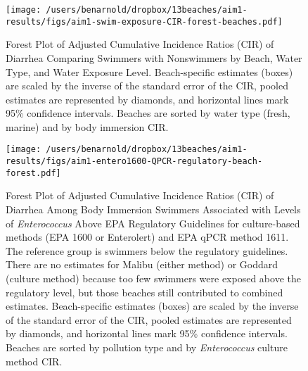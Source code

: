 \documentclass[12pt]{article}\usepackage[]{graphicx}\usepackage[]{color}
\begin{document}
\begin{landscape}
\begin{figure}[h!tb]
\begin{center}
\texttt{[image: /users/benarnold/dropbox/13beaches/aim1-results/figs/aim1-swim-exposure-CIR-forest-beaches.pdf]}
\caption{Forest Plot of Adjusted Cumulative Incidence Ratios (CIR) of Diarrhea Comparing Swimmers with Nonswimmers by Beach, Water Type, and Water Exposure Level. Beach-specific estimates (boxes) are scaled by the inverse of the standard error of the CIR, pooled estimates are represented by diamonds, and horizontal lines mark 95\% confidence intervals. Beaches are sorted by water type (fresh, marine) and by body immersion CIR. \label{fig:swimforest}}
\end{center}
\end{figure}
\end{landscape}


\begin{landscape}
\begin{figure}[h!tb]
\begin{center}
\texttt{[image: /users/benarnold/dropbox/13beaches/aim1-results/figs/aim1-entero1600-QPCR-regulatory-beach-forest.pdf]}
\caption{Forest Plot of Adjusted Cumulative Incidence Ratios (CIR) of Diarrhea Among Body Immersion Swimmers Associated with  Levels of \emph{Enterococcus} Above EPA Regulatory Guidelines for culture-based methods (EPA 1600 or Enterolert) and EPA qPCR method 1611. The reference group is swimmers below the regulatory guidelines. There are no estimates for Malibu (either method) or Goddard (culture method) because too few swimmers were exposed above the regulatory level, but those beaches still contributed to combined estimates. Beach-specific estimates (boxes) are scaled by the inverse of the standard error of the CIR, pooled estimates are represented by diamonds, and horizontal lines mark 95\% confidence intervals. Beaches are sorted by pollution type and by \textit{Enterococcus} culture method CIR.\label{fig:enteroregforest}}
\end{center}
\end{figure}
\end{landscape}

\clearpage
\setcounter{table}{0}
\setcounter{figure}{0}
\end{document}
